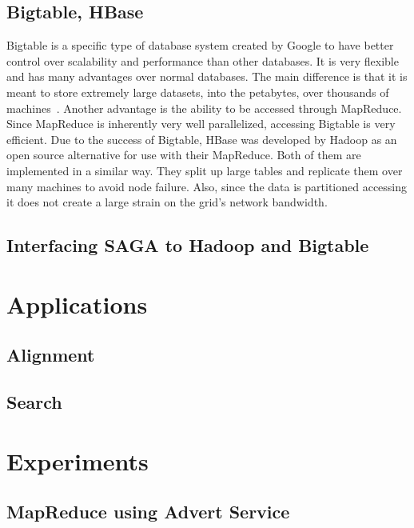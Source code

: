 \documentclass{rspublic}
\begin{document}
\subsection*{Bigtable, HBase}

Bigtable is a specific type of database system created by Google to 
have better control over scalability and performance than other 
databases.  It is very flexible and has many advantages over normal 
databases.  The main difference is that it is meant to store extremely 
large datasets, into the petabytes, over thousands of machines~\cite{bigtable}.  
Another advantage is the ability to be accessed through MapReduce.  Since 
MapReduce is inherently very well parallelized, accessing Bigtable is very 
efficient.  Due to the success of Bigtable, HBase was developed by Hadoop as 
an open source alternative for use with their MapReduce.  Both of them are 
implemented in a similar way.  They split up large tables and replicate them 
over many machines to avoid node failure.  Also, since the data is partitioned 
accessing it does not create a large strain on the grid's network bandwidth.


\subsection*{Interfacing SAGA to Hadoop and Bigtable}

\section{Applications}

\subsection*{Alignment}

\subsection*{Search}

\section*{Experiments}

\subsection*{MapReduce using Advert Service}
\end{document}
